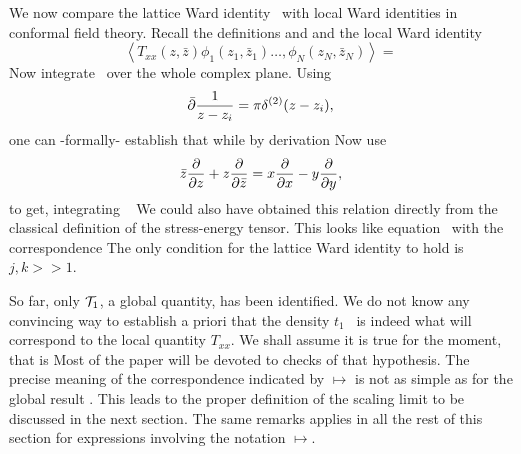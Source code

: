 
We now compare the lattice Ward identity \oper\ with local Ward identities
in conformal field theory. Recall the definitions
%
\eqn{}
%
and
%
\eqn{}
%
and the local Ward identity
$$
\left<T_{xx}(z,\bar{z})\phi_1(z_1,\bar{z}_1)\ldots,
\phi_N(z_N,\bar{z}_N)\right>=
$$
%
\eqn{}
%
Now integrate \cfttiii\ over the whole complex plane. Using
$$
\bar{\partial}{1\over z-z_i}=\pi\delta^{(2)}(z-z_i),
$$
one can -formally- establish that
%
\eqn{}
%
while by derivation
%
\eqn{}
%
Now use
$$
\bar{z}{\partial\over\partial z}+z{\partial\over\partial\bar{z}}=
x{\partial\over\partial x}
-y{\partial\over\partial y},
$$
to get, integrating \cfttiii\
%
\eqn{}
%
We could also have obtained this relation directly from the classical
definition of the stress-energy tensor. This looks like  equation \oper\ with
the correspondence
%
\eqn{}
%
The only condition for the lattice Ward identity to hold is $j,k>>1$.

So far, only ${\cal T}_1$, a global quantity, has been identified.
We do not know any convincing way
to establish a priori that the density $t_1$ \tttt\ is indeed what will
correspond to
the local quantity $T_{xx}$. We shall assume it is true for the moment, that is
%
\eqn{}
%
Most of the paper
will be devoted to checks of that hypothesis. The precise meaning of the
correspondence indicated by $\mapsto$
 is not as simple as
for the global result \corri. This leads
 to the proper definition of the scaling
limit to be discussed in the next  section. The same remarks applies in all the
rest of this section for expressions involving the notation $\mapsto$.



